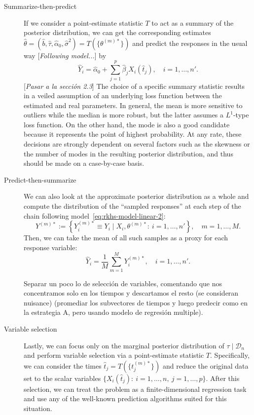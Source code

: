 \documentclass[ba]{imsart}
\numberwithin{equation}{section}
\theoremstyle{plain}
\newenvironment{comment}[1][comment-red]
{
\noindent \color{#1}
}
{
\color{black}
}
\newcommand\incomment[2][comment-red]{\color{#1}[\textit{#2}]\color{black}}
\begin{document}
\begin{description}
  \item[Summarize-then-predict] If we consider a point-estimate statistic \(T\) to act as a summary of the posterior distribution, we can get the corresponding estimates \(\hat{\theta}=(\hat b, \hat \tau, \hat{\alpha}_0, \hat{\sigma}^2) = T(\{\theta^{(m)*}\})\) and predict the responses in the usual way \incomment{Following model...} by
  \[
    \hat Y_i = \hat{\alpha}_0 + \sum_{j=1}^p \hat{\beta}_j X_i(\hat{t}_j), \quad i=1,\dots, n'.
  \]
  \incomment{Pasar a la sección 2.3} The choice of a specific summary statistic results in a veiled assumption of an underlying loss function between the estimated and real parameters. In general, the mean is more sensitive to outliers while the median is more robust, but the latter assumes a \(L^1\)-type loss function. On the other hand, the mode is also a good candidate because it represents the point of highest probability. At any rate, these decisions are strongly dependent on several factors such as the skewness or the number of modes in the resulting posterior distribution, and thus should be made on a case-by-case basis.
  \item[Predict-then-summarize] We can also look at the approximate posterior distribution as a whole and compute the distribution of the ``sampled responses'' at each step of the chain following model~\eqref{eq:rkhs-model-linear-2}:
  \[
  Y^{(m)*} := \left\{Y_i^{(m)*} \equiv Y_i \mid X_i, \theta^{(m)*}:\ i=1,\dots,n'\right\}, \quad m=1,\dots,M.
  \]
  Then, we can take the mean of all such samples as a proxy for each response variable:
  \[
  \hat Y_i = \frac{1}{M}\sum_{m=1}^M Y_i^{(m)*}, \quad i=1,\dots,n'.
  \]

  \begin{comment}
   Separar un poco lo de selección de variables, comentando que nos concentramos solo en los tiempos y descartamos el resto (se consideran nuisance) (promediar los subvectores de tiempos y luego predecir como en la estrategia A, pero usando modelo de regresión multiple).
  \end{comment}
  \item[Variable selection] Lastly, we can focus only on the marginal posterior distribution of \(\tau\mid\mathcal D_n\) and perform variable selection via a point-estimate statistic \(T\). Specifically, we can consider the times \(\hat t_j = T(\{t_j^{(m)*}\})\) and reduce the original data set to the scalar variables \(\{X_i(\hat t_j):\ i=1, \dots,n, \ j=1,\dots,p\}\). After this selection, we can treat the problem as a finite-dimensional regression task and use any of the well-known prediction algorithms suited for this situation.
\end{description}
\end{document}
